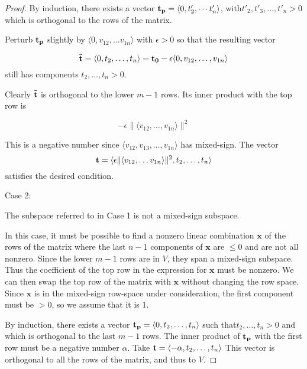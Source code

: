 \documentclass[11pt]{article}
\theoremstyle{plain} \newtheorem{thm}{Theorem}%
\theoremstyle{plain} \newtheorem{define}{Definition}%
\theoremstyle{plain} \newtheorem{example}{Example}%
\theoremstyle{plain} \newtheorem{remark}{Remark}%
\newcommand{\mixed}{mixed-sign}
\begin{document}
\begin{proof}
    \medskip

    By induction, there exists a vector ${\bf t_p} = \langle 0,t'_2,\cdots
    t'_n\rangle$, with\break$t'_2, t'_3, \ldots, t'_n > 0$ which is orthogonal to the rows of the matrix.

    Perturb ${\bf t_p}$ slightly by \epsilon$\langle0, v_{12}, \ldots
    v_{1n}\rangle$ with $\epsilon > 0$ so that the resulting vector

    $${\bf \tilde{t}} = \langle 0, t_2, \ldots, t_n\rangle =
    {\bf t_0} - \epsilon \langle 0,v_{12},\ldots,v_{1n}\rangle$$
    still has components $t_2,\ldots, t_n > 0$.

    Clearly ${\bf \tilde{t}}$ is orthogonal to the lower $m-1$
    rows.  Its inner product with the top row is

    $$-\epsilon \|\langle v_{12},\ldots,v_{1n}\rangle\|^2$$

    This is a negative number since $\langle v_{12},v_{13},\ldots,v_{1n}\rangle$
    has \mixed{}.  The
    vector
    $${\bf t} = \langle \epsilon \|\langle v_{12}, \ldots
    v_{1n}\rangle\|^2, t_2, \ldots, t_n\rangle$$
    satisfies the desired condition.
    
    \medskip

    \noindent Case 2:

    The subspace referred to in Case 1 is not a
    \mixed{} subspace.

    In this case, it must be possible to find a nonzero linear
    combination $\textbf{x}$ of the rows of the matrix where the last
    $n-1$ components of $\textbf{x}$ are $\le 0$ and are not all
    nonzero. Since the lower $m-1$ rows are in $V$, they span a \mixed{}
    subspace.  Thus the coefficient of the top row in the expression for
    $\textbf{x}$ must be nonzero. We can then swap the top row of the
    matrix with $\textbf{x}$ without changing the row space. Since
    $\textbf{x}$ is in the \mixed{} row-space under consideration, the
    first component must be $>0$, so we assume that it is $1$.

    By induction, there exists a vector ${\bf t_p} =
    \langle0,t_2,\ldots,t_n\rangle$ such that\break$t_2,\ldots,t_n > 0$ and
    which is orthogonal to the last $m-1$ rows.  The inner product of
    ${\bf t_p}$ with the first row must be a negative number
    $\alpha$.  Take ${\bf t} = \langle -\alpha,t_2,\ldots,t_n\rangle$
    This vector is orthogonal to all the rows of the matrix, and thus to
    $V$.


    
\end{proof}
\end{document}
